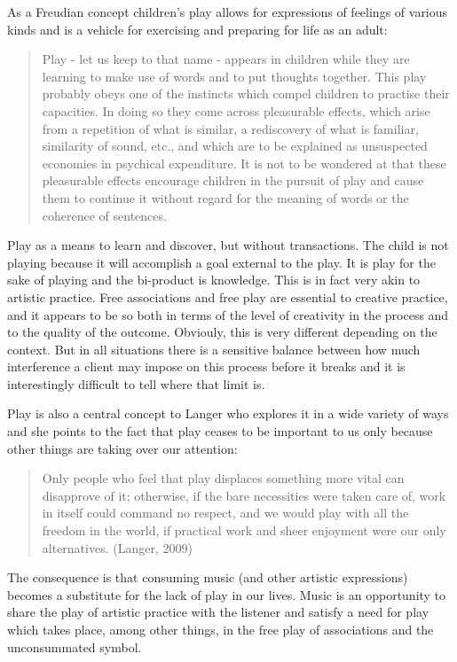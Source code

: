 \documentclass[11pt]{article}
\makeatletter
\newcommand{\citeprocitem}[2]{\hyper@linkstart{cite}{citeproc_bib_item_#1}#2\hyper@linkend}
\makeatother
\begin{document}
As a Freudian concept children's play allows for expressions of feelings of various kinds and is a vehicle for exercising and preparing for life as an adult:
\begin{quote}
Play - let us keep to that name - appears in children while they are learning to make use of words and to put thoughts together. This play probably obeys one of the instincts which compel children to practise their capacities. In doing so they come across pleasurable effects, which arise from a repetition of what is similar, a rediscovery of what is familiar, similarity of sound, etc., and which are to be explained as unsuspected economies in psychical expenditure. It is not to be wondered at that these pleasurable effects encourage children in the pursuit of play and cause them to continue it without regard for the meaning of words or the coherence of sentences.
\end{quote}
Play as a means to learn and discover, but without transactions. The child is not playing because it will accomplish a goal external to the play. It is play for the sake of playing and the bi-product is knowledge. This is in fact very akin to artistic practice. Free associations and free play are essential to creative practice, and it appears to be so both in terms of the level of creativity in the process and to the quality of the outcome. Obviouly, this is very different depending on the context. But in all situations there is a sensitive balance between how much interference a client may impose on this process before it breaks and it is interestingly difficult to tell where that limit is. 

Play is also a central concept to Langer who explores it in a wide variety of ways and she points to the fact that play ceases to be important to us only because other things are taking over our attention:
\begin{quote}
Only people who feel that play displaces something more vital can disapprove of it; otherwise, if the bare necessities were taken care of, work in itself could command no respect, and we would play with all the freedom in the world, if practical work and sheer enjoyment were our only alternatives. (\citeprocitem{6}{Langer, 2009})
\end{quote}
The consequence is that consuming music (and other artistic expressions) becomes a substitute for the lack of play in our lives. Music is an opportunity to share the play of artistic practice with the listener and satisfy a need for play which takes place, among other things, in the free play of associations and the unconsummated symbol.
\end{document}
